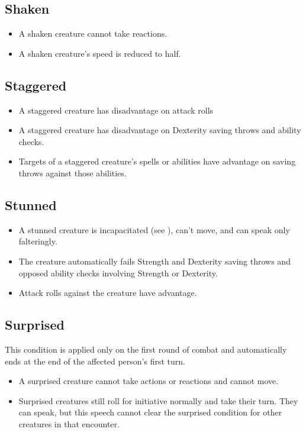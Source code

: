 \subsection{Shaken\label{condition:shaken}}
\begin{itemize}
	\item A shaken creature cannot take reactions.
	\item A shaken creature's speed is reduced to half.
\end{itemize}

\subsection{Staggered\label{condition:staggered}}
\begin{itemize}
	\item A staggered creature has disadvantage on attack rolls 
	\item A staggered creature has disadvantage on Dexterity saving throws and ability checks.
	\item Targets of a staggered creature's spells or abilities have advantage on saving throws against those abilities.
\end{itemize}

\subsection{Stunned\label{condition:stunned}}
\begin{itemize}
\item A stunned creature is incapacitated (see ), can't move, and can speak only falteringly.
\item The creature automatically fails Strength and Dexterity saving throws and opposed ability checks involving Strength or Dexterity.
\item Attack rolls against the creature have advantage.
\end{itemize}

\subsection{Surprised}\label{condition:surprised}
This condition is applied only on the first round of combat and automatically ends at the end of the affected person's first turn.
\begin{itemize}
	\item A surprised creature cannot take actions or reactions and cannot move. 
	\item Surprised creatures still roll for initiative normally and take their turn. They can speak, but this speech cannot clear the surprised condition for other creatures in that encounter.
\end{itemize}

